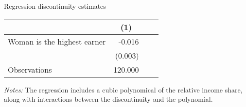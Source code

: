 \begin{center}
\begin{adjustbox}{max width=.9\textwidth}
\begin{threeparttable}[H]
\caption{Regression discontinuity estimates}
\label{tab:table_2}
\begin{tabular}{lrrr}
\toprule
\toprule
\textbf{}&\multicolumn{1}{c}{(1)} \\
\midrule
Woman is the highest earner&      -0.016\sym{***}\\
                    &     (0.003)         \\
\midrule Observations&     120.000         \\
\bottomrule
\bottomrule
\end{tabular}
\begin{tablenotes}
\item \footnotesize \textit{Notes:} The regression includes a cubic polynomical of the relative income share, along with interactions between the discontinuity and the polynomial. 
\end{tablenotes}
\end{threeparttable}
\end{adjustbox}
\end{center}
